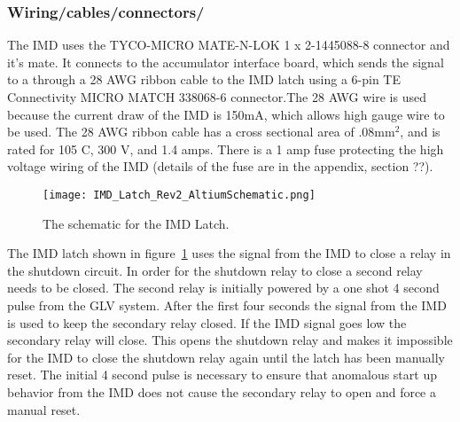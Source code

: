 \documentclass{article}
\begin{document}
\subsubsection{Wiring/cables/connectors/}

The  IMD uses the TYCO-MICRO MATE-N-LOK 1 x 2-1445088-8 connector and it's mate. It connects to the accumulator interface board, which sends the signal to a through a 28 AWG ribbon cable to the IMD latch using a 6-pin TE Connectivity MICRO MATCH 338068-6 connector.The 28 AWG wire is used because the current draw of the IMD is 150mA, which allows high gauge wire to be used. The 28 AWG ribbon cable has a cross sectional area of .08mm$^2$, and is rated for 105 \textdegree C, 300 V, and 1.4 amps. There is a 1 amp fuse protecting the high voltage wiring of the IMD (details of the fuse are in the appendix, section ??). %




\begin{figure} [!ht]
	\centering  %
	
	\texttt{[image: IMD\_Latch\_Rev2\_AltiumSchematic.png]}
	
	\caption{The schematic for the IMD Latch.}
	
	\label{fig:IMDLatch_Schematic}
\end{figure}

The IMD latch shown in figure~\ref{fig:IMDLatch_Schematic} uses the signal from the IMD to close a relay in the shutdown circuit. In order for the shutdown relay to close a second relay needs to be closed. The second relay is initially powered by a one shot 4 second pulse from the GLV system. After the first four seconds the signal from the IMD is used to keep the secondary relay closed. If the IMD signal goes low the secondary relay will close. This opens the shutdown relay and makes it impossible for the IMD to close the shutdown relay again until the latch has been manually reset. The initial 4 second pulse is necessary to ensure that anomalous start up behavior from the IMD does not cause the secondary relay to open and force a manual reset.
\end{document}
